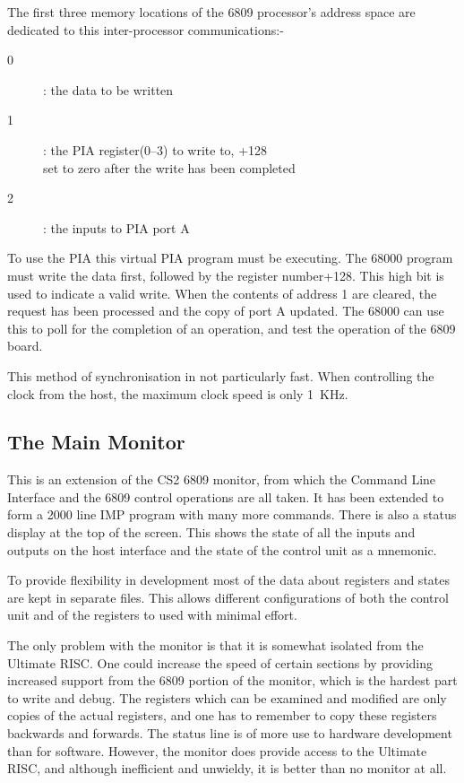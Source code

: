 The first three memory locations of the 6809 processor's address space are dedicated to this inter-processor communications:-
\begin{description}
\item[0] : the data to be written
\item[1] : the PIA register(0--3) to write to, +128\\
set to zero after the write has been completed
\item[2] : the inputs to PIA port A
\end{description}
To use the PIA this virtual PIA program must be executing. 
The 68000 program must write the data first, followed by the register number+128.
This high bit is used to indicate a valid write.
When the contents of address 1 are cleared, the request has been processed and the copy of port A updated. The 68000 can use this to poll for the completion of an operation, and test the operation of the 6809 board.

This method of synchronisation in not particularly fast.
When controlling the clock from the host, the maximum clock speed is only 1\ KHz.

\subsection{The Main Monitor}
This is an extension of the CS2 6809 monitor, from which the Command Line Interface and the 6809 control operations are all taken.
It has been extended to form a 2000 line IMP program with many more commands.
There is also a status display at the top of the screen.
This shows the state of all the inputs and outputs on the host interface and 
the state of the control unit   as a mnemonic.

To provide flexibility in development most of the  data about registers and states are kept in separate files. 
This allows different configurations of both the control unit and of the registers to used with minimal effort.

The only problem with the monitor is that it is somewhat isolated from the Ultimate RISC. 
One could increase the speed of certain sections by providing increased support from the 6809 portion of the monitor, which is the hardest part to write and debug.
The registers which can be examined and modified are only copies of the actual registers, and one has to remember to copy these registers backwards and forwards.
The status line is of more use to hardware development than for software.
However, the monitor does provide access to the Ultimate RISC, and although inefficient and unwieldy, it is better than no monitor at all. 


